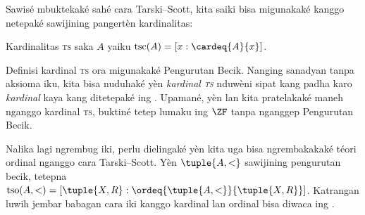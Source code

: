 \documentclass[../../../include/open-logic-section]{subfiles}
\begin{document}
Sawisé mbuktekaké sahé cara Tarski--Scott, kita saiki bisa migunakaké
kanggo netepaké sawijining pangertèn kardinalitas:

\begin{defn}
Kardinalitas \textsc{ts} saka $A$ yaiku $\text{tsc}(A) = [x :
\cardeq{A}{x}]$.
\end{defn}

Definisi kardinal \textsc{ts} ora migunakaké Pengurutan Becik.
Nanging sanadyan tanpa aksioma iku, kita bisa nuduhaké yèn
\emph{kardinal \textsc{ts}} nduwèni sipat kang padha karo
\emph{kardinal} kaya kang ditetepaké ing
.
Upamané, yèn 
lan  kita
pratelakaké maneh nganggo kardinal \textsc{ts}, buktiné tetep lumaku
ing $\ZF$ tanpa nganggep Pengurutan Becik.

Nalika lagi ngrembug iki, perlu dielingaké yèn kita uga bisa
ngrembakakaké téori ordinal nganggo cara Tarski--Scott. Yèn
$\tuple{A, <}$ sawijining pengurutan becik, tetepna
$\text{tso}(A, <) = [\tuple{X, R} :
\ordeq{\tuple{A, <}}{\tuple{X, R}}]$. Katrangan luwih jembar
babagan cara iki kanggo kardinal lan ordinal bisa diwaca ing
\citet[bab~9--12]{Potter2004}.
\end{document}
